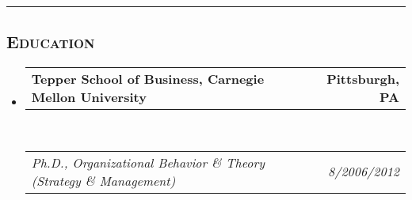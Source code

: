 \documentclass[12pt,letterpaper,oneside]{article}
\makeatletter
\newcommand{\headerrow}[2]
{\begin{tabular*}{\linewidth}{l@{\extracolsep{\fill}}r}
	#1 &
	#2 \\
\end{tabular*}}
\makeatother
\begin{document}
\begin{itemize}

\end{itemize}

\hrule

\vspace{-0.4em}
\subsection*{\centering\textsc{Education}}

\begin{itemize}
	\parskip=0.1em

	\item 
	\headerrow
		{\textbf{Tepper School of Business, Carnegie Mellon University}}
		{\textbf{Pittsburgh, PA}}
	\\
	\headerrow
		{\emph{Ph.D., Organizational Behavior \& Theory (Strategy \& Management)}}
		{\emph{8/2006\textendash 5/2012}}
	\vspace{-6mm}		
\end{itemize}
\end{document}
